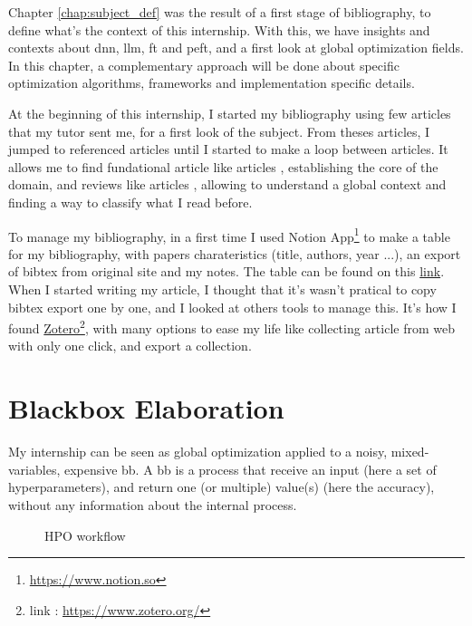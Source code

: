 Chapter \ref{chap:subject_def} was the result of a first stage of bibliography, to define what's the context of this internship. With this, we have insights and contexts about \acrshort{dnn}, \acrshort{llm}, \gls{ft} and \acrshort{peft}, and a first look at global optimization fields. In this chapter, a complementary approach will be done about specific optimization algorithms, frameworks and implementation specific details. 

At the beginning of this internship, I started my bibliography using few articles that my tutor sent me, for a first look of the subject. From theses articles, I jumped to referenced articles until I started to make a loop between articles. It allows me to find fundational article like articles \cite{vaswani_attention_2017,talbi_automated_2021}, establishing the core of the domain, and reviews like articles \cite{elsken_neural_2019,talbi_automated_2021}, allowing to understand a global context and finding a way to classify what I read before.

To manage my bibliography, in a first time I used Notion App\footnote{\href{https://www.notion.so}{https://www.notion.so}} to make a table for my bibliography, with papers charateristics (title, authors, year ...), an export of bibtex from original site and my notes. The table can be found on this \href{https://ribbon-crown-5f6.notion.site/6539799af4a24b32b6d4b91c4e07de49?v=b1542338391647aaa38cc8bb4ad1d5d8&pvs=4}{link}. When I started writing my article, I thought that it's wasn't pratical to copy bibtex export one by one, and I looked at others tools to manage this. It's how I found \href{https://www.zotero.org/}{Zotero}\footnote{link : \href{https://www.zotero.org/}{https://www.zotero.org/}}, with many options to ease my life like collecting article from web with only one click, and export a collection.

\section{Blackbox Elaboration}
\label{sec:blackbox}
My internship can be seen as global optimization applied to a noisy, mixed-variables, expensive \gls{bb}. A \gls{bb} is a process that receive an input (here a set of \glspl{hyperparameter}), and return one (or multiple) value(s) (here the accuracy), without any information about the internal process. 


\begin{figure}[h]
    \centering
    
    \caption{HPO workflow}
    \label{fig:hpo_workflow}
\end{figure}

